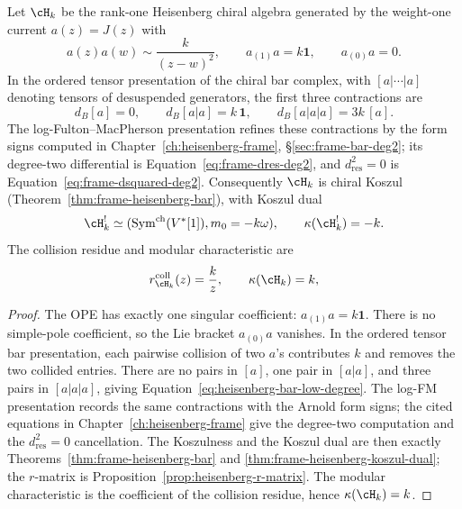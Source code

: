 \begin{proposition}
\label{prop:heisenberg-standard-family-ledger}
Let \(\cH_k\) be the rank-one Heisenberg chiral algebra generated by
the weight-one current \(a(z)=J(z)\) with
\[
 a(z)a(w)\sim \frac{k}{(z-w)^2},\qquad
 a_{(1)}a=k\mathbf 1,\qquad a_{(0)}a=0 .
\]
In the ordered tensor presentation of the chiral bar complex,
with \([a|\cdots|a]\) denoting tensors of desuspended generators,
the first three contractions are
\begin{equation}\label{eq:heisenberg-bar-low-degree}
d_B[a]=0,\qquad
d_B[a|a]=k\,\mathbf 1,\qquad
d_B[a|a|a]=3k\,[a].
\end{equation}
The log-Fulton--MacPherson presentation refines these contractions by
the form signs computed in
Chapter~\ref{ch:heisenberg-frame},
\S\ref{sec:frame-bar-deg2}; its degree-two differential is
Equation~\ref{eq:frame-dres-deg2}, and
\(d_{\mathrm{res}}^2=0\) is Equation~\ref{eq:frame-dsquared-deg2}.
Consequently \(\cH_k\) is chiral Koszul
(Theorem~\ref{thm:frame-heisenberg-bar}), with Koszul dual
\[
\cH_k^!\simeq(\operatorname{Sym}^{\mathrm{ch}}(V^*[1]),m_0=-k\omega),
\qquad
\kappa(\cH_k^!)=-k .
\]
The collision residue and modular characteristic are
\[
r_{\cH_k}^{\mathrm{coll}}(z)=\frac{k}{z},
\qquad
\kappa(\cH_k)=k,
\]
\end{proposition}

\begin{proof}
The OPE has exactly one singular coefficient: \(a_{(1)}a=k\mathbf 1\).
There is no simple-pole coefficient, so the Lie bracket
\(a_{(0)}a\) vanishes. In the ordered tensor bar presentation, each
pairwise collision of two \(a\)'s contributes \(k\) and removes the
two collided entries. There are no pairs in \([a]\), one pair in
\([a|a]\), and three pairs in \([a|a|a]\), giving
Equation~\eqref{eq:heisenberg-bar-low-degree}. The log-FM
presentation records the same contractions with the Arnold form signs;
the cited equations in Chapter~\ref{ch:heisenberg-frame} give the
degree-two computation and the \(d_{\mathrm{res}}^2=0\) cancellation.
The Koszulness and the Koszul dual are then exactly
Theorems~\ref{thm:frame-heisenberg-bar} and
\ref{thm:frame-heisenberg-koszul-dual}; the \(r\)-matrix is
Proposition~\ref{prop:heisenberg-r-matrix}. The modular
characteristic is the coefficient of the collision residue, hence
\(\kappa(\cH_k)=k\).
\end{proof}

